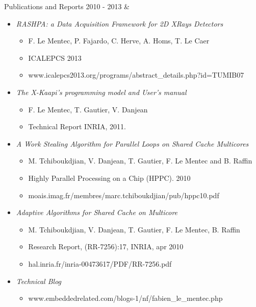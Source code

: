 \documentclass{resume}
\newcommand{\activite}[1]{\textbf{#1}\ }
\begin{document}
\newpage
\begin{rubriquetableau}[3cm]{Publications and Reports}
  \small{2010 - 2013}
  & \activite{}
  \begin{small}
    \begin{itemize}
    \item \textit{RASHPA: a Data Acquisition Framework for 2D XRays Detectors}
      \begin{itemize}
      \item F. Le Mentec, P. Fajardo, C. Herve, A. Homs, T. Le Caer
      \item ICALEPCS 2013
      \item www.icalepcs2013.org/programs/abstract\_details.php?id=TUMIB07
      \end{itemize}

    \item \textit{The X-Kaapi's programming model and User's manual}
      \begin{itemize}
      \item F. Le Mentec, T. Gautier, V. Danjean
      \item Technical Report INRIA, 2011.
      \end{itemize}

    \item \textit{A Work Stealing Algorithm for Parallel Loops on Shared Cache Multicores}
      \begin{itemize}
      \item M. Tchiboukdjian, V. Danjean, T. Gautier, F. Le Mentec and B. Raffin
      \item Highly Parallel Processing on a Chip (HPPC). 2010
      \item moais.imag.fr/membres/marc.tchiboukdjian/pub/hppc10.pdf
      \end{itemize}

    \item \textit{Adaptive Algorithms for Shared Cache on Multicore}
      \begin{itemize}
      \item M. Tchiboukdjian, V. Danjean, T. Gautier, F. Le Mentec, B. Raffin
      \item Research Report, ({RR}-7256):17, INRIA, apr 2010
      \item hal.inria.fr/inria-00473617/PDF/RR-7256.pdf
      \end{itemize}

    \item \textit{Technical Blog}
      \begin{itemize}
      \item www.embeddedrelated.com/blogs-1/nf/fabien\_le\_mentec.php
      \end{itemize}

    \end{itemize}
  \end{small}
\end{rubriquetableau}
\end{document}
